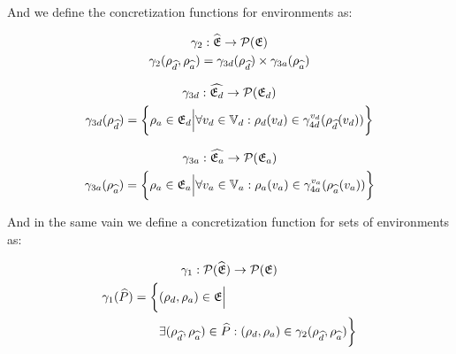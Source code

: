 And we define the concretization functions for environments as:


\begin{gather}
    \gamma_2 : \widehat{\mathfrak{E}} \rightarrow \mathcal{P}(\mathfrak{E})\\
    \gamma_2(\rho_{\widehat{d}}, \rho_{\widehat{a}}) = \gamma_{3d}(\rho_{\widehat{d}}) \times \gamma_{3a}(\rho_{\widehat{a}})
\end{gather}


\begin{gather}
    \gamma_{3d} : \widehat{\mathfrak{E}_d} \rightarrow \mathcal{P}(\mathfrak{E}_d)\\
    \gamma_{3d}(\rho_{\widehat{d}}) = \biggl\{ \rho_{a} \in \mathfrak{E}_d \Big| \forall v_d \in \mathbb{V}_d : \rho_d(v_d) \in \gamma^{v_d}_{4d}(\rho_{\widehat{d}}(v_d)) \biggr\}
\end{gather}


\begin{gather}
    \gamma_{3a} : \widehat{\mathfrak{E}_a} \rightarrow \mathcal{P}(\mathfrak{E}_a)\\
    \gamma_{3a}(\rho_{\widehat{a}}) = \biggl\{ \rho_{a} \in \mathfrak{E}_a \Big| \forall v_a \in \mathbb{V}_a : \rho_a(v_a) \in \gamma^{v_a}_{4a}(\rho_{\widehat{a}}(v_a)) \biggr\}
\end{gather}


And in the same vain we define a concretization function for sets of environments as:


\begin{gather}
    \gamma_1 : \mathcal{P}(\widehat{\mathfrak{E}}) \rightarrow \mathcal{P}(\mathfrak{E})\\
    \begin{split}
        \gamma_1(\widehat{P}) = \biggl\{ &(\rho_{d}, \rho_{a}) \in \mathfrak{E} \Big|\\
        &\exists (\rho_{\widehat{d}}, \rho_{\widehat{a}}) \in \widehat{P} : (\rho_{d}, \rho_{a}) \in \gamma_2(\rho_{\widehat{d}}, \rho_{\widehat{a}})\biggr\}
    \end{split}
\end{gather}

